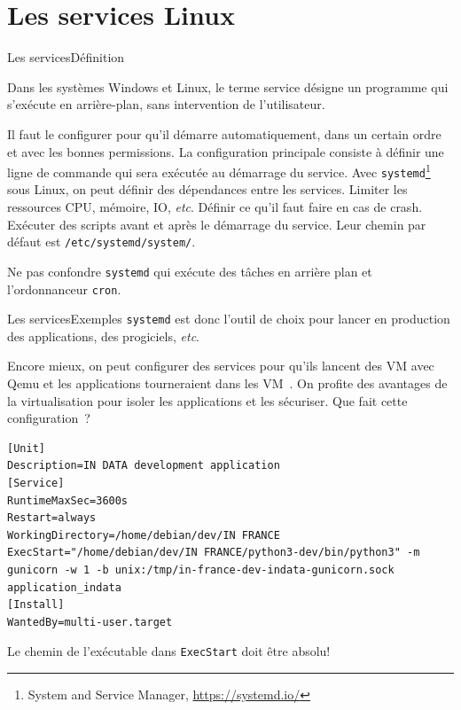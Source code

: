 \documentclass{beamer}
\begin{document}
    \section{Les services Linux}\label{sec:les-services}

    \begin{frame}{Les services}{Définition}
        \begin{footnotesize}
            Dans les systèmes Windows et Linux, le terme service désigne un programme qui s'exécute en arrière-plan, sans intervention de l'utilisateur.

            Il faut le configurer pour qu'il démarre automatiquement, dans un certain ordre et avec les bonnes permissions.
            \bigbreak
            La configuration principale consiste à définir une ligne de commande qui sera exécutée au démarrage du service.
            \bigbreak
            Avec \lstinline{systemd}\footnote{System and Service Manager, \url{https://systemd.io/}} sous Linux, on peut définir des dépendances entre les services.
            Limiter les ressources CPU, mémoire, IO, \textit{etc}.
            Définir ce qu'il faut faire en cas de crash.
            Exécuter des scripts avant et après le démarrage du service.
            \bigbreak
            Leur chemin par défaut est \lstinline{/etc/systemd/system/}.
            \begin{dangercolorbox}
                Ne pas confondre \lstinline{systemd} qui exécute des tâches en arrière plan et l'ordonnanceur \lstinline{cron}.
            \end{dangercolorbox}
        \end{footnotesize}
    \end{frame}

    \begin{frame}[fragile]{Les services}{Exemples}
        \lstinline{systemd} est donc l'outil de choix pour lancer en production des applications, des progiciels, \textit{etc}.

        Encore mieux, on peut configurer des services pour qu'ils lancent des VM avec Qemu et les applications tourneraient dans les VM~.
        On profite des avantages de la virtualisation pour isoler les applications et les sécuriser.
        \bigbreak
        Que fait cette configuration~?
        \begin{lstlisting}
[Unit]
Description=IN DATA development application
[Service]
RuntimeMaxSec=3600s
Restart=always
WorkingDirectory=/home/debian/dev/IN FRANCE
ExecStart="/home/debian/dev/IN FRANCE/python3-dev/bin/python3" -m gunicorn -w 1 -b unix:/tmp/in-france-dev-indata-gunicorn.sock application_indata
[Install]
WantedBy=multi-user.target
        \end{lstlisting}
        \begin{dangercolorbox}
            Le chemin de l'exécutable dans \lstinline{ExecStart} doit être absolu!
        \end{dangercolorbox}
    \end{frame}
\end{document}
